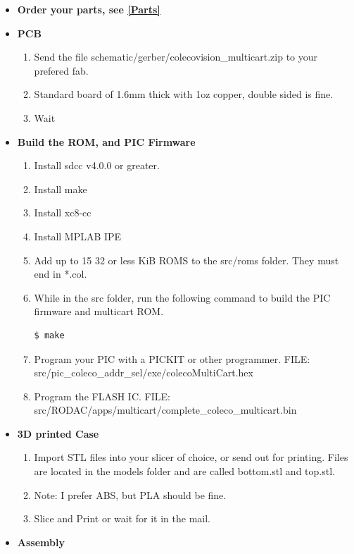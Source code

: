 \documentclass{article}
\begin{document}
  \begin{itemize}
    \item \textbf{Order your parts, see {\ref{Parts}}}
    \item \textbf{PCB}
      \begin{enumerate}
        \item Send the file schematic/gerber/colecovision\_multicart.zip to your prefered fab.
        \item Standard board of 1.6mm thick with 1oz copper, double sided is fine.
        \item Wait
      \end{enumerate}
    \item \textbf{Build the ROM, and PIC Firmware}
      \begin{enumerate}
        \item Install sdcc v4.0.0 or greater.
        \item Install make
        \item Install xc8-cc
        \item Install MPLAB IPE
        \item Add up to 15 32 or less KiB ROMS to the src/roms folder. They must end in *.col.
        \item While in the src folder, run the following command to build the PIC firmware and multicart ROM.
        {\begin{lstlisting}[language=bash]
          $ make
        \end{lstlisting}}
        \item Program your PIC with a PICKIT or other programmer. FILE: src/pic\_coleco\_addr\_sel/exe/colecoMultiCart.hex
        \item Program the FLASH IC. FILE: src/RODAC/apps/multicart/complete\_coleco\_multicart.bin
      \end{enumerate}
    \item \textbf{3D printed Case}
      \begin{enumerate}
        \item Import STL files into your slicer of choice, or send out for printing. Files are located in the models folder and are called bottom.stl and top.stl.
        \item Note: I prefer ABS, but PLA should be fine.
        \item Slice and Print or wait for it in the mail.
      \end{enumerate}
    \item \textbf{Assembly}
      \begin{enumerate}

\end{enumerate}
\end{itemize}
\end{document}
